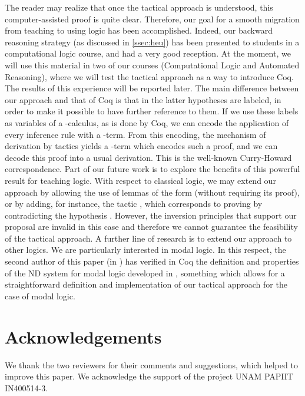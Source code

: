 \documentclass[a4paper,UKenglish]{lipics}
\begin{document}
The reader may realize that once the tactical approach is understood, this computer-assisted proof is quite clear. Therefore, our goal for a smooth migration from teaching to using logic has been accomplished. Indeed, our backward reasoning strategy (as discussed in \ref{ssec:heu})
has been presented to students in a computational logic course, and had
a very good reception. At the moment, we will use this material in two of
our courses (Computational Logic and Automated Reasoning), where we will test the
tactical approach as a way to introduce {\sc Coq}. The results of
this experience will be reported later. 
The main difference between our approach and that of {\sc Coq} is that in the latter hypotheses are labeled, in order to make it possible to have further reference to them. If we use these labels as variables of a -calculus, as is done by {\sc Coq}, we can encode the application of every inference rule with a -term. From this encoding, the mechanism of derivation by tactics yields a -term which encodes such a proof, and we can decode this proof into a usual derivation. This is the well-known Curry-Howard correspondence. Part of our future work is to explore the benefits of this powerful result for teaching logic. With respect to classical logic, we may extend our approach by allowing the use of lemmas of the form  (without requiring its proof), or by adding, for instance, the tactic , which corresponds to proving  by contradicting the hypothesis . However, the inversion principles that 
support our proposal are invalid in this case and therefore we cannot guarantee the feasibility of the tactical approach. A further line of research is to extend our approach to other logics. We are particularly interested in modal logic. In this respect, the second author of this paper (in \cite{l15}) has verified in {\sc Coq} the definition and properties of the ND system for modal logic developed in \cite{pd}, something which allows for a straightforward definition and implementation of our tactical approach for the case of modal logic.


\section*{Acknowledgements}

We thank the two reviewers for their comments and suggestions, which helped to improve this paper. We 
acknowledge the support of the project UNAM PAPIIT IN400514-3.
\end{document}
